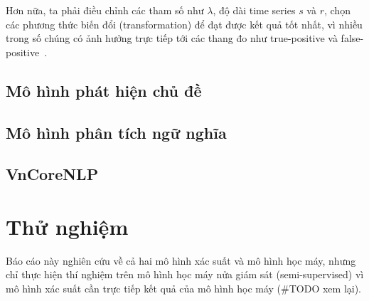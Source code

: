 Hơn nữa, ta phải điều chỉnh các tham số như $\lambda$, độ dài time series $s$
và $r$, chọn các phương thức biến đổi (transformation) để đạt được kết quả tốt
nhất, vì nhiều trong số chúng có ảnh hưởng trực tiếp tới các thang đo như
true-positive và false-positive~\cite{hendricksonTrendDetectionSocial2015}.

\subsection{Mô hình phát hiện chủ đề}

\subsection{Mô hình phân tích ngữ nghĩa}

\subsection{VnCoreNLP}

\section{Thử nghiệm}
Báo cáo này nghiên cứu về cả hai mô hình xác suất và mô hình học máy, nhưng
chỉ thực hiện thí nghiệm trên mô hình học máy nửa giám sát (semi-supervised) vì
mô hình xác suất cần trực tiếp kết quả của mô hình học máy (\#TODO xem lại).

\label{sec:experiments}
